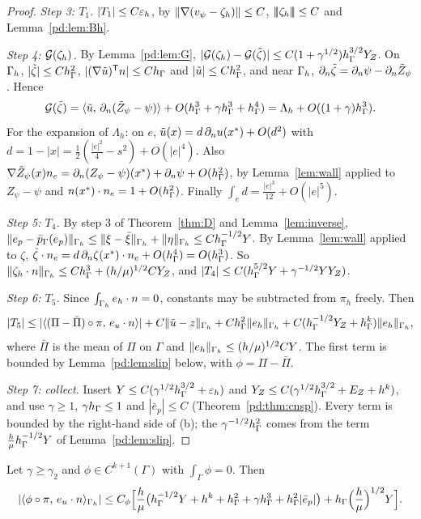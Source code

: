 \begin{proof}
\emph{Step 3: $T_1$.} $|T_1|\le C\varepsilon_h$, by $\lVert \nabla(v_\psi-\zeta_h)\rVert\le C$, $|\!|\!|\zeta_h|\!|\!|\le C$ and Lemma~\ref{pd:lem:Bh}.

\emph{Step 4: $\mathcal G(\zeta_h)$.} By Lemma~\ref{pd:lem:G}, $|\mathcal G(\zeta_h)-\mathcal G(\tilde\zeta)|\le C(1+\gamma^{1/2})h_\Gamma^{3/2}Y_Z$. On $\Gamma_h$, $|\tilde\zeta|\le Ch_\Gamma^2$, $|(\nabla\tilde u)^{\mathsf T}n|\le Ch_\Gamma$ and $|\tilde u|\le Ch_\Gamma^2$, and near $\Gamma_h$, $\partial_n\tilde\zeta=\partial_n\psi-\partial_n\tilde Z_\psi$. Hence
\[
\mathcal G(\tilde\zeta)=\langle \tilde u,\, \partial_n(\tilde Z_\psi-\psi)\rangle+O(h_\Gamma^3+\gamma h_\Gamma^3+h_\Gamma^4)=\Lambda_h+O((1+\gamma)h_\Gamma^3).
\]
For the expansion of $\Lambda_h$: on $e$, $\tilde u(x)=d\,\partial_n u(x^\ast)+O(d^2)$ with $d=1-|x|=\frac12(\frac{|e|^2}4-s^2)+O(|e|^4)$. Also $\nabla\tilde Z_\psi(x)n_e=\partial_n(Z_\psi-\psi)(x^\ast)+\partial_n\psi+O(h_\Gamma^2)$, by Lemma~\ref{lem:wall} applied to $Z_\psi-\psi$ and $n(x^\ast)\cdot n_e=1+O(h_\Gamma^2)$. Finally $\int_ed=\frac{|e|^3}{12}+O(|e|^5)$.

\emph{Step 5: $T_4$.} By step 3 of Theorem~\ref{thm:D} and Lemma~\ref{lem:inverse}, $\lVert e_p-\bar p_{\Gamma}(e_p)\rVert_{\Gamma_h}\le\lVert \xi-\bar\xi\rVert_{\Gamma_h}+\lVert \eta\rVert_{\Gamma_h}\le Ch_\Gamma^{-1/2}Y$. By Lemma~\ref{lem:wall} applied to $\zeta$, $\tilde\zeta\cdot n_e=d\,\partial_n\zeta(x^\ast)\cdot n_e+O(h_\Gamma^4)=O(h_\Gamma^3)$. So $\lVert \zeta_h\cdot n\rVert_{\Gamma_h}\le Ch_\Gamma^3+(h/\mu)^{1/2}CY_Z$, and $|T_4|\le C(h_\Gamma^{5/2}Y+\gamma^{-1/2}YY_Z)$.

\emph{Step 6: $T_5$.} Since $\int_{\Gamma_h}e_h\cdot n=0$, constants may be subtracted from $\pi_h$ freely. Then
\[
|T_5|\le|\langle (\Pi-\bar\Pi)\circ\pi,\, e_u\cdot n\rangle|+C\lVert \tilde u-z\rVert_{\Gamma_h}+Ch_\Gamma^2\lVert e_h\rVert_{\Gamma_h}+C(h_\Gamma^{-1/2}Y_Z+h_\Gamma^k)\lVert e_h\rVert_{\Gamma_h},
\]
where $\bar\Pi$ is the mean of $\Pi$ on $\Gamma$ and $\lVert e_h\rVert_{\Gamma_h}\le(h/\mu)^{1/2}CY$. The first term is bounded by Lemma~\ref{pd:lem:slip} below, with $\phi=\Pi-\bar\Pi$.

\emph{Step 7: collect.} Insert $Y\le C(\gamma^{1/2}h_\Gamma^{3/2}+\varepsilon_h)$ and $Y_Z\le C(\gamma^{1/2}h_\Gamma^{3/2}+E_Z+h^k)$, and use $\gamma\ge1$, $\gamma h_\Gamma\le1$ and $|\bar e_p|\le C$ (Theorem~\ref{pd:thm:cnsp}). Every term is bounded by the right-hand side of (b); the $\gamma^{-1/2}h_\Gamma^2$ comes from the term $\frac h\mu h_\Gamma^{-1/2}Y$ of Lemma~\ref{pd:lem:slip}.
\end{proof}

\begin{lemma}\label{pd:lem:slip}
Let $\gamma\ge\gamma_2$ and $\phi\in C^{k+1}(\Gamma)$ with $\int_\Gamma\phi=0$. Then
\[
|\langle \phi\circ\pi,\, e_u\cdot n\rangle_{\Gamma_h}|\le C_\phi\Bigl[\frac h\mu\bigl(h_\Gamma^{-1/2}Y+h^k+h_\Gamma^2+\gamma h_\Gamma^3+h_\Gamma^2|\bar e_p|\bigr)+h_\Gamma\Bigl(\frac h\mu\Bigr)^{1/2}Y\Bigr].
\]
\end{lemma}

